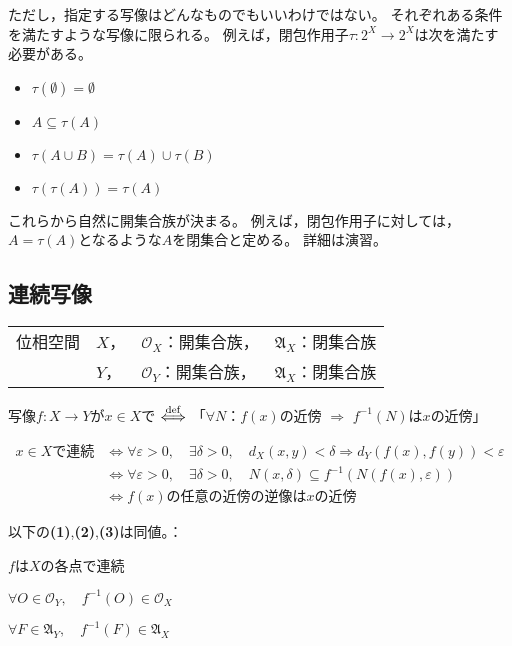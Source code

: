 \documentclass[uplatex]{jsarticle}
\begin{document}
ただし，指定する写像はどんなものでもいいわけではない。
それぞれある条件を満たすような写像に限られる。
例えば，閉包作用子$\tau \colon 2^{X} \longrightarrow 2^{X}$は次を満たす必要がある。
\begin{itemize}
  \vspace{-0.5\baselineskip}
  \item $\tau (\emptyset) = \emptyset$
  \item $A \subseteq \tau(A)$
  \item $\tau (A \cup B) = \tau (A) \cup \tau (B)$
  \item $\tau (\tau (A)) = \tau (A)$
  \vspace{-0.5\baselineskip}
\end{itemize}

これらから自然に開集合族が決まる。
例えば，閉包作用子に対しては，$A = \tau (A)$となるような$A$を閉集合と定める。
詳細は演習。

\subsection{連続写像}
\renewcommand{\arraystretch}{0.8}
\begin{tabular}{ll@{\,}l@{\,}l}
  位相空間 & $X$， & $\mathcal{O}_{X}$：開集合族， & $\mathfrak{A}_{X}$：閉集合族 \\
           & $Y$， & $\mathcal{O}_{Y}$：開集合族， & $\mathfrak{A}_{X}$：閉集合族
\end{tabular}

\begin{teigi}
  写像$f \colon X \longrightarrow Y$が$x \in X$で $\overset{\mathrm{def}}{\Longleftrightarrow}$ 
  「$\forall N$：$f(x)$の近傍 $\Longrightarrow$ $f^{-1}(N)$は$x$の近傍」
\end{teigi}

\begin{align*}
  x \in X \text{で連続} & \Longleftrightarrow \forall \varepsilon > 0, \quad \exists \delta > 0, \quad d_{X} (x,y) < \delta \Longrightarrow d_{Y}(f(x), f(y)) < \varepsilon \\
  & \Longleftrightarrow \forall \varepsilon > 0, \quad \exists \delta > 0, \quad N(x,\delta) \subseteq f^{-1} (N(f(x), \varepsilon)) \\
  & \Longleftrightarrow f(x) \text{の任意の近傍の逆像は} x \text{の近傍}
\end{align*}

\begin{teiri}
  以下の{\bf (1)},{\bf (2)},{\bf (3)}は同値。：
  
   $f$は$X$の各点で連続

   $\forall O \in \mathcal{O}_{Y}, \quad f^{-1}(O) \in \mathcal{O}_{X}$

   $\forall F \in \mathfrak{A}_{Y}, \quad f^{-1}(F) \in \mathfrak{A}_{X}$
\end{teiri}
\end{document}
